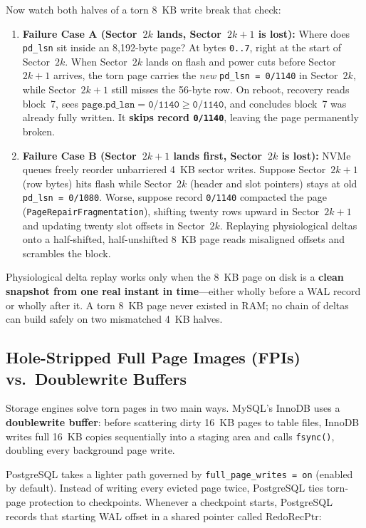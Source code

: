 Now watch both halves of a torn 8~KB write break that check:

\begin{enumerate}
  \item \textbf{Failure Case A (Sector~$2k$ lands, Sector~$2k+1$ is lost):}
    Where does \texttt{pd\_lsn} sit inside an 8,192-byte page? At bytes \texttt{0..7}, right at the start of Sector~$2k$. When Sector~$2k$ lands on flash and power cuts before Sector~$2k+1$ arrives, the torn page carries the \emph{new} \texttt{pd\_lsn = 0/1140} in Sector~$2k$, while Sector~$2k+1$ still misses the 56-byte row. On reboot, recovery reads block~7, sees $\texttt{page.pd\_lsn} = \texttt{0/1140} \ge \texttt{0/1140}$, and concludes block~7 was already fully written. It \textbf{skips record \texttt{0/1140}}, leaving the page permanently broken.
  \item \textbf{Failure Case B (Sector~$2k+1$ lands first, Sector~$2k$ is lost):}
    NVMe queues freely reorder unbarriered 4~KB sector writes. Suppose Sector~$2k+1$ (row bytes) hits flash while Sector~$2k$ (header and slot pointers) stays at old \texttt{pd\_lsn = 0/1080}. Worse, suppose record \texttt{0/1140} compacted the page (\texttt{PageRepairFragmentation}), shifting twenty rows upward in Sector~$2k+1$ and updating twenty slot offsets in Sector~$2k$. Replaying physiological deltas onto a half-shifted, half-unshifted 8~KB page reads misaligned offsets and scrambles the block.
\end{enumerate}

\begin{whybox}
Physiological delta replay works only when the 8~KB page on disk is a \textbf{clean snapshot from one real instant in time}---either wholly before a WAL record or wholly after it. A torn 8~KB page never existed in RAM; no chain of deltas can build safely on two mismatched 4~KB halves.
\end{whybox}

\subsection{Hole-Stripped Full Page Images (FPIs) vs.\ Doublewrite Buffers}

Storage engines solve torn pages in two main ways. MySQL's InnoDB uses a \textbf{doublewrite buffer}: before scattering dirty 16~KB pages to table files, InnoDB writes full 16~KB copies sequentially into a staging area and calls \texttt{fsync()}, doubling every background page write.

PostgreSQL takes a lighter path governed by \texttt{full\_page\_writes = on} (enabled by default). Instead of writing every evicted page twice, PostgreSQL ties torn-page protection to checkpoints. Whenever a checkpoint starts, PostgreSQL records that starting WAL offset in a shared pointer called $\mathrm{RedoRecPtr}$:

